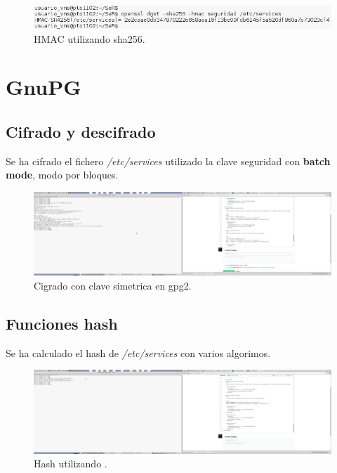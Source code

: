 \documentclass[11pt]{article}
\begin{document}
      \begin{figure}[!h]
        \centering
        \includegraphics[width = .9\textwidth]{hmac_sha256}
        \caption{HMAC utilizando sha256.}
      \end{figure}

  \section{GnuPG}
    \subsection{Cifrado y descifrado}
      \par
      Se ha cifrado el fichero \textit{/etc/services} utilizado la clave seguridad con \textbf{batch mode}, modo por bloques.
      
      \begin{figure}[!h]
        \centering
        \includegraphics[width = .9\textwidth]{cipher_gpg2}
        \caption{Cigrado con clave simetrica en gpg2.}
      \end{figure}

    \subsection{Funciones hash}
      \par
      Se ha calculado el hash de \textit{/etc/services} con varios algorimos.

      \begin{figure}[!h]
        \centering
        \includegraphics[width = .9\textwidth]{gpg2hash_md5}
        \caption{Hash utilizando .}
      \end{figure}
\end{document}
